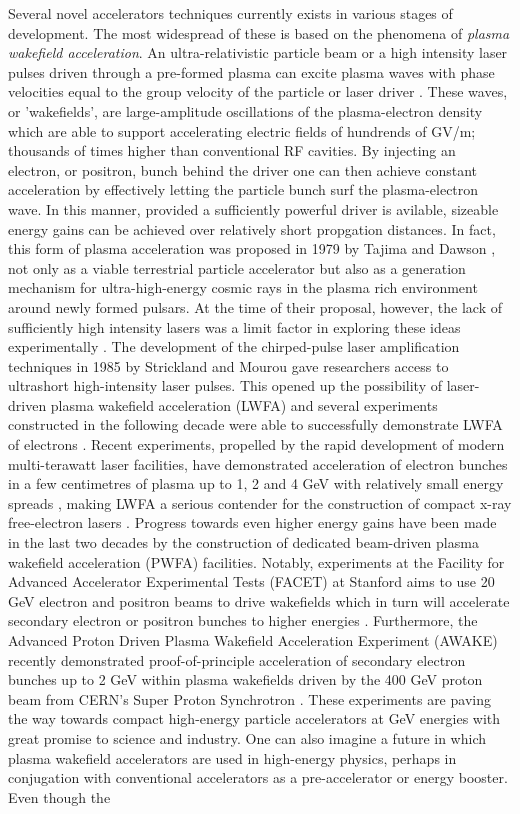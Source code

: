 \indent Several novel accelerators techniques currently exists in various stages of development. The most widespread of these is based on the phenomena of \textit{plasma wakefield acceleration}. An ultra-relativistic particle beam or a high intensity laser pulses driven through a pre-formed plasma can excite plasma waves with phase velocities equal to the group velocity of the particle or laser driver \cite{Chen2002}. These waves, or 'wakefields', are large-amplitude oscillations of the plasma-electron density which are able to support accelerating electric fields of hundrends of GV/m; thousands of times higher than conventional RF cavities. By injecting an electron, or positron, bunch behind the driver one can then achieve constant acceleration by effectively letting the particle bunch surf the plasma-electron wave. In this manner, provided a sufficiently powerful driver is avilable, sizeable energy gains can be achieved over relatively short propgation distances. In fact, this form of plasma acceleration was proposed in 1979 by Tajima and Dawson \cite{Tajima1979}, not only as a viable terrestrial particle accelerator but also as a generation mechanism for ultra-high-energy cosmic rays in the plasma rich environment around newly formed pulsars. At the time of their proposal, however, the lack of sufficiently high intensity lasers was a limit factor in exploring these ideas experimentally \cite{Esarey2009}. The development of the chirped-pulse laser amplification techniques in 1985 by Strickland and Mourou \cite{Strickland1985} gave researchers access to ultrashort high-intensity laser pulses. This opened up the possibility of laser-driven plasma wakefield acceleration (LWFA) and several experiments constructed in the following decade were able to successfully demonstrate LWFA of electrons \cite{Clayton1993}. Recent experiments, propelled by the rapid development of modern multi-terawatt laser facilities, have demonstrated acceleration of electron bunches in a few centimetres of plasma up to 1, 2 and 4 GeV with relatively small energy spreads \cite{Leemans, Wang2013,  Leemans2014}, making LWFA a serious contender for the construction of compact x-ray free-electron lasers \cite{Huang2012}. Progress towards even higher energy gains have been made in the last two decades by the construction of dedicated beam-driven plasma wakefield acceleration (PWFA) facilities. Notably, experiments at the Facility for Advanced Accelerator Experimental Tests (FACET) at Stanford aims to use 20 GeV electron and positron beams to drive wakefields which in turn will accelerate secondary electron or positron bunches to higher energies \cite{Facet}. Furthermore, the Advanced Proton Driven Plasma Wakefield Acceleration Experiment (AWAKE) recently demonstrated proof-of-principle acceleration of secondary electron bunches up to 2 GeV within plasma wakefields driven by the 400 GeV proton beam from CERN’s Super Proton Synchrotron \cite{Adli2018}. These experiments are paving the way towards compact high-energy particle accelerators at GeV energies with great promise to science and industry. One can also imagine a future in which plasma wakefield accelerators are used in high-energy physics, perhaps in conjugation with conventional accelerators as a pre-accelerator or energy booster. Even though the 